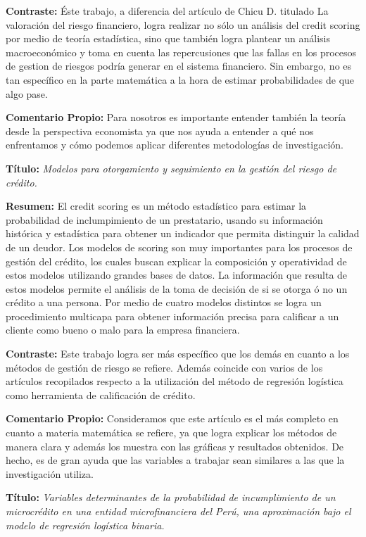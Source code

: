 \documentclass[
  letterpaper,
  DIV=11,
  numbers=noendperiod]{scrreprt}
\begin{document}
\textbf{Contraste:} Éste trabajo, a diferencia del artículo de Chicu D.
titulado La valoración del riesgo financiero, logra realizar no sólo un
análisis del credit scoring por medio de teoría estadística, sino que
también logra plantear un análisis macroeconómico y toma en cuenta las
repercusiones que las fallas en los procesos de gestion de riesgos
podría generar en el sistema financiero. Sin embargo, no es tan
específico en la parte matemática a la hora de estimar probabilidades de
que algo pase.

\textbf{Comentario Propio:} Para nosotros es importante entender también
la teoría desde la perspectiva economista ya que nos ayuda a entender a
qué nos enfrentamos y cómo podemos aplicar diferentes metodologías de
investigación.

\textbf{Título:} \emph{Modelos para otorgamiento y seguimiento en la
gestión del riesgo de crédito.}

\textbf{Resumen:} El credit scoring es un método estadístico para
estimar la probabilidad de inclumpimiento de un prestatario, usando su
información histórica y estadística para obtener un indicador que
permita distinguir la calidad de un deudor. Los modelos de scoring son
muy importantes para los procesos de gestión del crédito, los cuales
buscan explicar la composición y operatividad de estos modelos
utilizando grandes bases de datos. La información que resulta de estos
modelos permite el análisis de la toma de decisión de si se otorga ó no
un crédito a una persona. Por medio de cuatro modelos distintos se logra
un procedimiento multicapa para obtener información precisa para
calificar a un cliente como bueno o malo para la empresa financiera.

\textbf{Contraste:} Este trabajo logra ser más específico que los demás
en cuanto a los métodos de gestión de riesgo se refiere. Además coincide
con varios de los artículos recopilados respecto a la utilización del
método de regresión logística como herramienta de calificación de
crédito.

\textbf{Comentario Propio:} Consideramos que este artículo es el más
completo en cuanto a materia matemática se refiere, ya que logra
explicar los métodos de manera clara y además los muestra con las
gráficas y resultados obtenidos. De hecho, es de gran ayuda que las
variables a trabajar sean similares a las que la investigación utiliza.

\textbf{Título:} \emph{Variables determinantes de la probabilidad de
incumplimiento de un microcrédito en una entidad microfinanciera del
Perú, una aproximación bajo el modelo de regresión logística binaria.}
\end{document}
